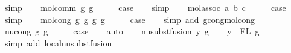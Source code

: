 \begin{isabellebody}
\ simp\isanewline
{}\isamarkupfalse%
\isanewline
\ \ \isamarkupfalse%
\ {\isacharparenleft}{\kern0pt}mol{\isacharunderscore}{\kern0pt}comm\ g{}\ g{}{\isacharparenright}{\kern0pt}\isanewline
\ \ \isamarkupfalse%
\ \isamarkupfalse%
\ {\isacharquery}{\kern0pt}case\isanewline
\ \ \isamarkupfalse%
\ simp\isanewline
{}\isamarkupfalse%
\isanewline
\ \ \isamarkupfalse%
\ {\isacharparenleft}{\kern0pt}mol{\isacharunderscore}{\kern0pt}assoc\ a\ b\ c{\isacharparenright}{\kern0pt}\isanewline
\ \ \isamarkupfalse%
\ \isamarkupfalse%
\ {\isacharquery}{\kern0pt}case\isanewline
\ \ \isamarkupfalse%
\ simp\isanewline
{}\isamarkupfalse%
\isanewline
\ \ \isamarkupfalse%
\ {\isacharparenleft}{\kern0pt}mol{\isacharunderscore}{\kern0pt}cong\ g{}\ g{}{\isacharprime}{\kern0pt}\ g{}\ g{}{\isacharprime}{\kern0pt}{\isacharparenright}{\kern0pt}\isanewline
\ \ \isamarkupfalse%
\ \isamarkupfalse%
\ {\isacharquery}{\kern0pt}case\isanewline
\ \ \isamarkupfalse%
\ {\isacharparenleft}{\kern0pt}simp\ add{\isacharcolon}{\kern0pt}\ gcong{\isachardot}{\kern0pt}mol{\isacharunderscore}{\kern0pt}cong{\isacharparenright}{\kern0pt}\isanewline
{}\isamarkupfalse%
\isanewline
\ \ \isamarkupfalse%
\ {\isacharparenleft}{\kern0pt}nu{\isacharunderscore}{\kern0pt}cong\ g\ g{\isacharprime}{\kern0pt}{\isacharparenright}{\kern0pt}\isanewline
\ \ \isamarkupfalse%
\ \isamarkupfalse%
\ {\isacharquery}{\kern0pt}case\isanewline
\ \ \isamarkupfalse%
\ auto\isanewline
{}\isamarkupfalse%
\isanewline
\ \ \isamarkupfalse%
\ {\isacharparenleft}{\kern0pt}nu{\isacharunderscore}{\kern0pt}subst{\isacharunderscore}{\kern0pt}fusion{}\ y\ g{\isacharparenright}{\kern0pt}\isanewline
\isanewline
\ \ \isamarkupfalse%
\ {\isachardoublequoteopen}y\ {\isasymin}\ FL\ g{\isachardoublequoteclose}\isanewline
\ \ \ \ \isamarkupfalse%
\ {\isacharparenleft}{\kern0pt}simp\ add{\isacharcolon}{\kern0pt}\ local{\isachardot}{\kern0pt}nu{\isacharunderscore}{\kern0pt}subst{\isacharunderscore}{\kern0pt}fusion{}{\isacharparenright}{\kern0pt}\isanewline
\ \ \isamarkupfalse%

\end{isabellebody}
